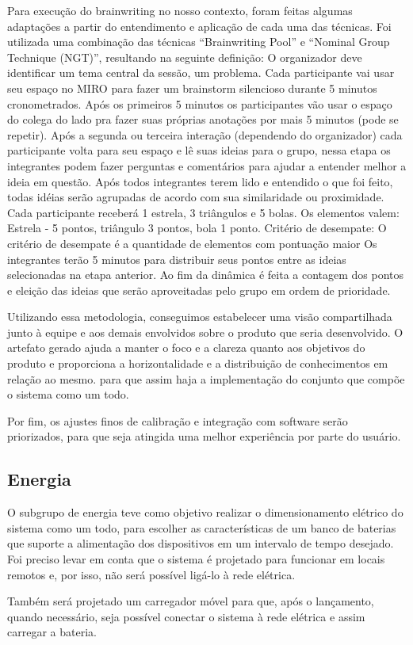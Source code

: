 Para execução do brainwriting no nosso contexto, foram feitas algumas adaptações a partir do entendimento e aplicação de cada uma das técnicas.
Foi utilizada uma combinação das técnicas “Brainwriting Pool” e  “Nominal Group Technique (NGT)”, resultando na seguinte definição:
O organizador deve identificar um tema central da sessão, um problema. 
Cada participante vai usar seu espaço no MIRO para fazer um brainstorm silencioso durante 5 minutos cronometrados.
Após os primeiros 5 minutos os participantes vão usar o espaço do colega do lado pra fazer suas próprias anotações por mais 5 minutos (pode se repetir). 
Após a segunda ou terceira interação (dependendo do organizador) cada participante volta para seu espaço e lê suas ideias para o grupo, nessa etapa os integrantes podem fazer perguntas e comentários para ajudar a entender melhor a ideia em questão.
Após todos integrantes terem lido e entendido o que foi feito, todas idéias serão agrupadas de acordo com sua similaridade ou proximidade.
Cada participante receberá 1 estrela, 3 triângulos e 5 bolas. Os elementos valem: Estrela - 5 pontos, triângulo 3 pontos, bola 1 ponto.
Critério de desempate: O critério de desempate é a quantidade de elementos com pontuação maior
Os integrantes terão 5 minutos para distribuir seus pontos entre as ideias selecionadas na etapa anterior.
Ao fim da dinâmica é feita a contagem dos pontos e eleição das ideias que serão aproveitadas pelo grupo em ordem de prioridade.


Utilizando essa metodologia, conseguimos estabelecer uma visão compartilhada junto à equipe e aos demais envolvidos sobre o produto que seria desenvolvido. O artefato gerado ajuda a manter o foco e a clareza quanto aos objetivos do produto e proporciona a horizontalidade e a distribuição de conhecimentos em relação ao mesmo.
 para que assim haja a implementação do conjunto que compõe o sistema como um todo. 
\par Por fim, os ajustes finos de calibração e integração com software serão priorizados, para que seja atingida uma melhor experiência por parte do usuário.

\subsection{Energia}
\par O subgrupo de energia teve como objetivo realizar o dimensionamento elétrico do sistema como um todo, para escolher as características de um banco de baterias que suporte a alimentação dos dispositivos em um intervalo de tempo desejado. Foi preciso levar em conta que o sistema é projetado para funcionar em locais remotos e, por isso, não será possível ligá-lo à rede elétrica.
\par Também será projetado um carregador móvel para que, após o lançamento, quando necessário, seja possível conectar o sistema à rede elétrica e assim carregar a bateria.

